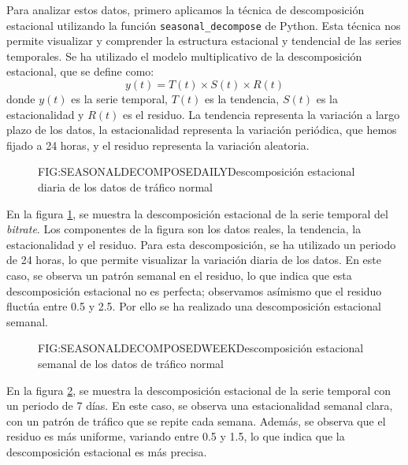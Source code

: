 Para analizar estos datos, primero aplicamos la técnica de descomposición estacional utilizando la función \texttt{seasonal\_decompose} de Python. Esta técnica nos permite visualizar y comprender la estructura estacional y tendencial de las series temporales. Se ha utilizado el modelo multiplicativo de la descomposición estacional, que se define como:
\begin{equation}
    \boxed{y(t)}= T(t) \times S(t) \times R(t)
\end{equation}
donde $y(t)$ es la serie temporal, $T(t)$ es la tendencia, $S(t)$ es la estacionalidad y $R(t)$ es el residuo. La tendencia representa la variación a largo plazo de los datos, la estacionalidad representa la variación periódica, que hemos fijado a 24 horas, y el residuo representa la variación aleatoria.

\begin{figure}[Descomposición estacional diaria de los datos de tráfico normal]{FIG:SEASONALDECOMPOSEDAILY}{Descomposición estacional diaria de los datos de tráfico normal}
    \label{FIG:SEASONALDECOMPOSEDAILY}
\end{figure}

En la figura \ref{FIG:SEASONALDECOMPOSEDAILY}, se muestra la descomposición estacional de la serie temporal del \textit{bitrate}. Los componentes de la figura son los datos reales, la tendencia, la estacionalidad y el residuo. Para esta descomposición, se ha utilizado un periodo de 24 horas, lo que permite visualizar la variación diaria de los datos. En este caso, se observa un patrón semanal en el residuo, lo que indica que esta descomposición estacional no es perfecta; observamos asímismo que el residuo fluctúa entre 0.5 y 2.5. Por ello se ha realizado una descomposición estacional semanal.

\begin{figure}[Descomposición estacional semanal de los datos de tráfico normal]{FIG:SEASONALDECOMPOSEDWEEK}{Descomposición estacional semanal de los datos de tráfico normal}
    \label{FIG:SEASONALDECOMPOSEDWEEK}
\end{figure}

En la figura \ref{FIG:SEASONALDECOMPOSEDWEEK}, se muestra la descomposición estacional de la serie temporal con un periodo de 7 días. En este caso, se observa una estacionalidad semanal clara, con un patrón de tráfico que se repite cada semana. Además, se observa que el residuo es más uniforme, variando entre 0.5 y 1.5, lo que indica que la descomposición estacional es más precisa.

